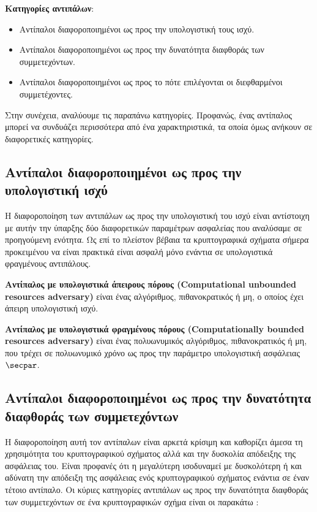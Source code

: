 \begin{definition}
\textbf{Κατηγορίες αντιπάλων}:
\begin{itemize}
    \item Αντίπαλοι διαφοροποιημένοι ως προς την υπολογιστική τους ισχύ.
    \item Αντίπαλοι διαφοροποιημένοι ως προς την δυνατότητα διαφθοράς των συμμετεχόντων.
    \item Αντίπαλοι διαφοροποιημένοι ως προς το πότε επιλέγονται οι διεφθαρμένοι συμμετέχοντες.
\end{itemize}
\end{definition}

Στην συνέχεια, αναλύουμε τις παραπάνω κατηγορίες. Προφανώς, ένας αντίπαλος μπορεί να συνδυάζει περισσότερα από ένα χαρακτηριστικά, τα οποία όμως ανήκουν σε διαφορετικές κατηγορίες.

\subsection{Αντίπαλοι διαφοροποιημένοι ως προς την υπολογιστική ισχύ}

Η διαφοροποίηση των αντιπάλων ως προς την υπολογιστική του ισχύ είναι αντίστοιχη με αυτήν την ύπαρξης δύο διαφορετικών παραμέτρων ασφαλείας που αναλύσαμε σε προηγούμενη ενότητα. Ως επί το πλείστον βέβαια τα κρυπτογραφικά σχήματα σήμερα προκειμένου να είναι πρακτικά είναι ασφαλή μόνο ενάντια σε υπολογιστικά φραγμένους αντιπάλους.

\begin{definition}
\textbf{Αντίπαλος με υπολογιστικά άπειρους πόρους (Computational unbounded resources adversary)} είναι ένας αλγόριθμος, πιθανοκρατικός ή μη, ο οποίος έχει άπειρη υπολογιστική ισχύ.
\end{definition}

\begin{definition}
\textbf{Αντίπαλος με υπολογιστικά φραγμένους πόρους (Computationally bounded resources adversary)} είναι ένας πολυωνυμικός αλγόριθμος, πιθανοκρατικός ή μη, που τρέχει σε πολυωνυμικό χρόνο ως προς την παράμετρο υπολογιστική ασφάλειας $\secpar$.
\end{definition}

\subsection{Αντίπαλοι διαφοροποιημένοι ως προς την δυνατότητα διαφθοράς των συμμετεχόντων}

Η διαφοροποίηση αυτή τον αντίπαλων είναι αρκετά κρίσιμη και καθορίζει άμεσα τη χρησιμότητα του κρυπτογραφικού σχήματος αλλά και την δυσκολία απόδειξης της ασφάλειας του. Είναι προφανές ότι η μεγαλύτερη ισοδυναμεί με δυσκολότερη ή και αδύνατη την απόδειξη της ασφάλειας ενός κρυπτογραφικού σχήματος ενάντια σε έναν τέτοιο αντίπαλο. Οι κύριες κατηγορίες αντιπάλων ως προς την δυνατότητα διαφθοράς των συμμετεχόντων σε ένα κρυπτογραφικών σχήμα είναι οι παρακάτω :

